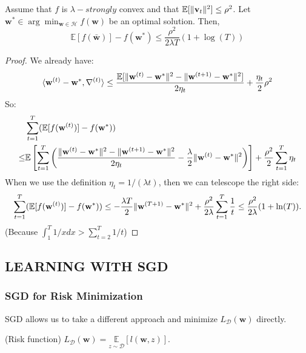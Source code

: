 \begin{thm}
	\label{thm_14_11}
	Assume that $f$ is $ \lambda-strongly $ convex and that $ \mathbb{E} [\Arrowvert \mathbf{v}_t \Arrowvert^2] \le \rho^2 $.
	Let $ \mathbf{w}^* \in \arg\min_{\mathbf{w}\in\mathcal{H}} f(\mathbf{w}) $ be an optimal solution. Then,
	\begin{equation}
		\mathbb{E}[f(\mathbf{\bar w})] - f(\mathbf{w}^*) \le \frac{\rho^2}{2\lambda T}(1+\log(T))
	\end{equation}
	\begin{proof}
		We already have:
		\begin{equation}
			\langle \mathbf{w}^{(t)} - \mathbf{w}^*, \nabla^{(t)} \rangle
			\le \frac{\mathbb{E}[\Arrowvert \mathbf{w}^{(t)} - \mathbf{w}^* \Arrowvert^2 - 
			\Arrowvert \mathbf{w}^{(t+1)} - \mathbf{w}^* \Arrowvert^2]}{2\eta_t} + \frac{\eta_t}{2} \rho^2
		\end{equation}
		So:
		\begin{align*}
			&\sum^T_{t=1} (\mathbb{E}[f(\mathbf{w}^{(t)})] - f(\mathbf{w}^*)) \\
			\le& \mathbb{E} \left[ \sum\limits^T_{t=1} \left( 
					\frac{\Arrowvert \mathbf{w}^{(t)} - \mathbf{w}^* \Arrowvert^2 - 
					\Arrowvert \mathbf{w}^{(t+1)} - \mathbf{w}^* \Arrowvert^2} {2\eta_t}	
					- \frac{\lambda}{2}
					\Arrowvert \mathbf{w}^{(t)} - \mathbf{w}^* \Arrowvert^2
			\right)	\right]
			+ \frac{\rho^2}{2} \sum\limits^T_{t=1} \eta_t
		\end{align*}
		When we use the definition $ \eta_t = 1/(\lambda t) $, then we can telescope the right side:
		\[ 
			\sum\limits^T_{t=1} ( \mathbb{E}[f(\mathbf{w}^{(t)})] - f(\mathbf{w}^*))
			\le -\frac{\lambda T}{2} \Arrowvert \mathbf{w}^{(T+1)} - \mathbf{w}^{*} \Arrowvert^2 +
			\frac{\rho^2}{2\lambda} \sum\limits^T_{t=1} \frac{1}{t}
			\le \frac{\rho^2}{2\lambda}(1+\ln(T)).
		\]
		(Because $ \int^{T}_1 1/x dx > \sum^T_{t=2} 1/t$) 
	\end{proof}
\end{thm}

\subsection{LEARNING WITH SGD}

\subsubsection{SGD for Risk Minimization}
SGD allows us to take a different approach and minimize $ L_{\mathcal{D}}(\mathbf{w}) $ directly.
\begin{defn} (Risk function)
	$ L_{\mathcal{D}}(\mathbf{w}) = \underset{z\sim\mathcal{D}}{\mathbb{E}}[ l(\mathbf{w}, z)] $.
\end{defn}

